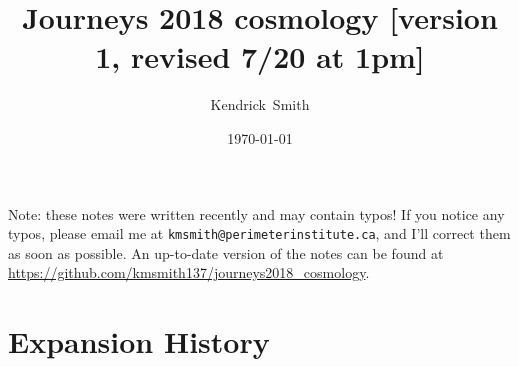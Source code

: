 \documentclass[aps,prd,superscriptaddress,groupedaddress,nofootinbib,nobibnotes]{revtex4}
\begin{document}
\title{Journeys 2018 cosmology [version 1, revised 7/20 at 1pm]}

\author{Kendrick~Smith}

\date{\today}


\maketitle

\par\noindent
Note: these notes were written recently and may contain typos!  If you notice any typos, please
email me at {\tt kmsmith@perimeterinstitute.ca}, and I'll correct them as soon as possible.  An up-to-date
version of the notes can be found at \url{https://github.com/kmsmith137/journeys2018_cosmology}.

\section{Expansion History}
\end{document}
